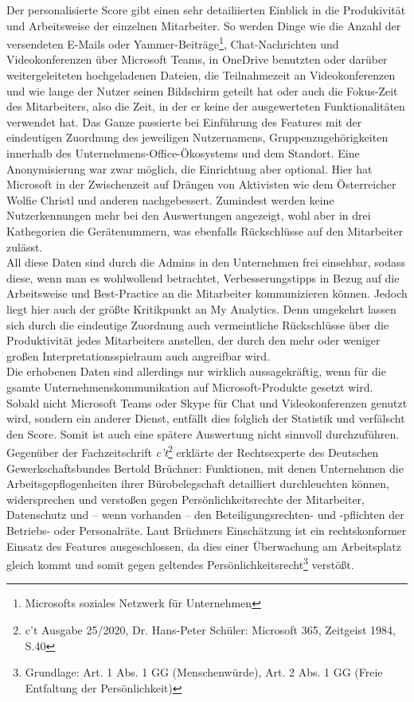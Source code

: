 Der personalisierte Score gibt einen sehr detailiierten Einblick in die Produkivität und Arbeitsweise der einzelnen Mitarbeiter. So werden Dinge wie die Anzahl der versendeten E-Mails oder Yammer-Beiträge\footnote{Microsofts soziales Netzwerk für Unternehmen}, Chat-Nachrichten und Videokonferenzen über Microsoft Teams, in OneDrive benutzten oder  darüber weitergeleiteten hochgeladenen Dateien, die Teilnahmezeit an Videokonferenzen und wie lange der Nutzer seinen Bildschirm geteilt hat oder auch die \glqq Fokus-Zeit\grqq{} des Mitarbeiters, also die Zeit, in der er keine der ausgewerteten Funktionalitäten verwendet hat. Das Ganze passierte bei Einführung des Features mit der eindeutigen Zuordnung des jeweiligen Nutzernamens, Gruppenzugehörigkeiten innerhalb des Unternehmens-Office-Ökosystems und dem Standort. Eine Anonymisierung war zwar möglich, die Einrichtung aber optional. Hier hat Microsoft in der Zwischenzeit auf Drängen von Aktivisten wie dem Österreicher Wolfie Christl und anderen nachgebessert. Zumindest werden keine Nutzerkennungen mehr bei den Auswertungen angezeigt, wohl aber in drei Kathegorien die Gerätenummern, was ebenfalls Rückschlüsse auf den Mitarbeiter zulässt.\\

All diese Daten sind durch die Admins in den Unternehmen frei einsehbar, sodass diese, wenn man es wohlwollend betrachtet, Verbesserungstipps in Bezug auf die Arbeitsweise und Best-Practice an die Mitarbeiter kommunizieren können. Jedoch liegt hier auch der größte Kritikpunkt an My Analytics. Denn umgekehrt lassen sich durch die eindeutige Zuordnung auch vermeintliche Rückschlüsse über die Produktivität jedes Mitarbeiters anstellen, der durch den mehr oder weniger großen Interpretationsspielraum auch angreifbar wird.\\
Die erhobenen Daten sind allerdings nur wirklich aussagekräftig, wenn für die gsamte Unternehmenskommunikation auf Microsoft-Produkte gesetzt wird. Sobald nicht Microsoft Teams oder Skype für Chat und Videokonferenzen genutzt wird, sondern ein anderer Dienst, entfällt dies folglich der Statistik und verfälscht den Score. Somit ist auch eine spätere Auswertung nicht sinnvoll durchzuführen.\\

Gegenüber der Fachzeitschrift \textit{c't}\footnote{c't Ausgabe 25/2020, Dr. Hans-Peter Schüler: \glqq Microsoft 365, Zeitgeist 1984\grqq{}, S.40} erklärte der Rechtsexperte des Deutschen Gewerkschaftsbundes Bertold Brüchner: \glqq Funktionen, mit denen Unternehmen die Arbeitsgepflogenheiten ihrer Bürobelegschaft detailliert durchleuchten können, widersprechen und verstoßen gegen Persönlichkeitsrechte der Mitarbeiter, Datenschutz und – wenn vorhanden – den Beteiligungsrechten- und -pflichten der Betriebs- oder Personalräte.\grqq{} Laut Brüchners Einschätzung ist ein rechtskonformer Einsatz des Features ausgeschlossen, da dies einer Überwachung am Arbeitsplatz gleich kommt und somit gegen geltendes Persönlichkeitsrecht\footnote{Grundlage: Art. 1 Abs. 1 GG (Menschenwürde), Art. 2 Abs. 1 GG (Freie Entfaltung der Persönlichkeit)} verstößt.\\

\vfill